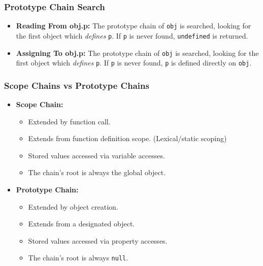 \begin{frame}
    \frametitle{Prototype Chain Search}
    \begin{itemize}
        \item{\textbf{Reading From obj.p:} The prototype chain of \texttt{obj}
              is searched, looking for the first object which \textit{defines}
              \texttt{p}. If \texttt{p} is never found, \texttt{undefined} is
              returned.}
        \item{\textbf{Assigning To obj.p:}} The prototype chain of \texttt{obj}
              is searched, looking for the first object which \textit{defines}
              \texttt{p}. If \texttt{p} is never found, \texttt{p} is defined
              directly on \texttt{obj}.
    \end{itemize}
\end{frame}

\begin{frame}
    \frametitle{Scope Chains vs Prototype Chains}
    \begin{itemize}
        \item{\textbf{Scope Chain:}}
        \begin{itemize}
            \item{Extended by function call.}
            \item{Extends from function definition scope. (Lexical/static
                  scoping)}
            \item{Stored values accessed via variable accesses.}
            \item{The chain's root is always the global object.}
        \end{itemize}
        \item{\textbf{Prototype Chain:}}
        \begin{itemize}
            \item{Extended by object creation.}
            \item{Extends from a designated object.}
            \item{Stored values accessed via property accesses.}
            \item{The chain's root is always \texttt{null}.}
        \end{itemize}
    \end{itemize}
\end{frame}
